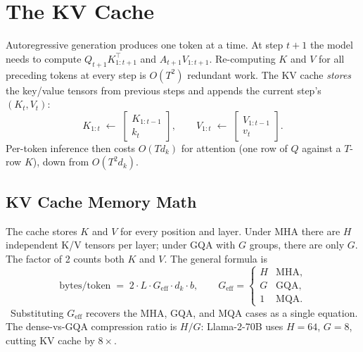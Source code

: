 \section{The KV Cache}

Autoregressive generation produces one token at a time. At step $t+1$
the model needs to compute $Q_{t+1} K_{1:t+1}^{\top}$ and
$A_{t+1} V_{1:t+1}$. Re-computing $K$ and $V$ for all preceding
tokens at every step is $O(T^2)$ redundant work. The KV cache
\emph{stores} the key/value tensors from previous steps and appends
the current step's $(K_t, V_t)$:
\begin{equation}
\label{eq:ch5-kvcache}
K_{1:t} \;\leftarrow\; \begin{bmatrix} K_{1:t-1} \\ k_t \end{bmatrix},
\qquad
V_{1:t} \;\leftarrow\; \begin{bmatrix} V_{1:t-1} \\ v_t \end{bmatrix}.
\end{equation}
Per-token inference then costs $O(T d_k)$ for attention (one row of
$Q$ against a $T$-row $K$), down from $O(T^2 d_k)$.

\subsection{KV Cache Memory Math}

The cache stores $K$ and $V$ for every position and layer. Under
MHA there are $H$ independent K/V tensors per layer; under GQA with
$G$ groups, there are only $G$. The factor of 2 counts both $K$ and
$V$. The general formula is
\begin{equation}
\label{eq:ch5-kvbytes}
\text{bytes/token}
\;=\; 2 \cdot L \cdot G_{\mathrm{eff}} \cdot d_k \cdot b,
\qquad
G_{\mathrm{eff}} = \begin{cases}
H & \text{MHA}, \\
G & \text{GQA}, \\
1 & \text{MQA}.
\end{cases}
\end{equation}
\Ident\ Substituting $G_{\mathrm{eff}}$ recovers the MHA, GQA, and MQA
cases as a single equation. The dense-vs-GQA compression ratio is
$H/G$: Llama-2-70B uses $H=64$, $G=8$, cutting KV cache by $8\times$.

